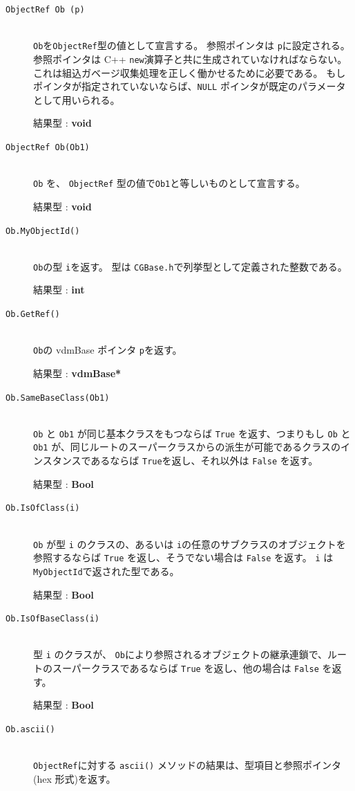 \documentclass[\pformat,12pt]{jarticle}
\begin{document}
\vspace{0.5cm}

\begin{description}
\item[{\tt ObjectRef Ob (p)}] \mbox{}\\
      {\tt Ob}を{\tt ObjectRef}型の値として宣言する。
参照ポインタは {\tt p}に設定される。
 参照ポインタは C++ {\tt new}演算子と共に生成されていなければならない。これは組込ガベージ収集処理を正しく働かせるために必要である。  
もしポインタが指定されていないならば、{\tt NULL} ポインタが既定のパラメータとして用いられる。
     
     結果型 : {\bf void}

\item[{\tt ObjectRef Ob(Ob1)}] \mbox{}\\
     {\tt Ob} を、 {\tt ObjectRef} 型の値で{\tt Ob1}と等しいものとして宣言する。
     
     結果型 : {\bf void}

\item[{\tt Ob.MyObjectId()}] \mbox{}\\
     {\tt Ob}の型 {\tt i}を返す。
型は \texttt{CGBase.h}で列挙型として定義された整数である。

     結果型 : {\bf int}

\item[{\tt Ob.GetRef()}] \mbox{}\\
     {\tt Ob}の vdmBase ポインタ {\tt p}を返す。

     結果型 : {\bf vdmBase*}

\item[\texttt{Ob.SameBaseClass(Ob1)}] \mbox{}\\
      \texttt{Ob} と \texttt{Ob1} が同じ基本クラスをもつならば \texttt{True} を返す、つまりもし \texttt{Ob} と \texttt{Ob1} が、同じルートのスーパークラスからの派生が可能であるクラスのインスタンスであるならば \texttt{True}を返し、それ以外は \texttt{False} を返す。

     結果型 : \textbf{Bool}
     
\item[\texttt{Ob.IsOfClass(i)}] \mbox{}\\
     \texttt{Ob} が型 \texttt{i} のクラスの、あるいは \texttt{i}の任意のサブクラスのオブジェクトを参照するならば \texttt{True} を返し、そうでない場合は  \texttt{False} を返す。 
\texttt{i}
     は \texttt{MyObjectId}で返された型である。

     結果型 : \textbf{Bool}

\item[\texttt{Ob.IsOfBaseClass(i)}] \mbox{}\\
   型 \texttt{i} のクラスが、 \texttt{Ob}により参照されるオブジェクトの継承連鎖で、ルートのスーパークラスであるならば \texttt{True} を返し、他の場合は \texttt{False} を返す。

     結果型 : \textbf{Bool}

\item [\texttt{Ob.ascii()}] \mbox{}\\
      {\tt ObjectRef}に対する {\tt ascii()} メソッドの結果は、型項目と参照ポインタ (hex 形式)を返す。


\end{description}     
\end{document}
